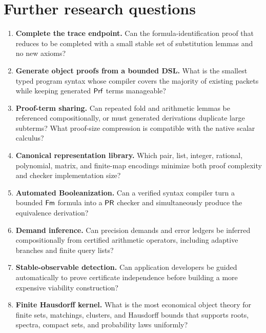 \section{Further research questions}
\label{sec:research}

\begin{enumerate}[label=\textbf{Q\arabic*.}]
\item \textbf{Complete the trace endpoint.}  Can the formula-identification
      proof that reduces  to
       be completed with a small stable set of
      substitution lemmas and no new axioms?

\item \textbf{Generate object proofs from a bounded DSL.}  What is the smallest
      typed program syntax whose compiler covers the majority of existing
      packets while keeping generated \(\mathsf{Prf}\) terms manageable?

\item \textbf{Proof-term sharing.}  Can repeated fold and arithmetic lemmas be
      referenced compositionally, or must generated derivations duplicate
      large subterms?  What proof-size compression is compatible with the
      native scalar calculus?

\item \textbf{Canonical representation library.}  Which pair, list, integer,
      rational, polynomial, matrix, and finite-map encodings minimize both
      proof complexity and checker implementation size?

\item \textbf{Automated Booleanization.}  Can a verified syntax compiler turn a
      bounded \(\mathsf{Fm}\) formula into a \(\mathsf{PR}\) checker and simultaneously produce
      the equivalence derivation?

\item \textbf{Demand inference.}  Can precision demands and error ledgers be
      inferred compositionally from certified arithmetic operators, including
      adaptive branches and finite query lists?

\item \textbf{Stable-observable detection.}  Can application developers be
      guided automatically to prove certificate independence before building a
      more expensive viability construction?

\item \textbf{Finite Hausdorff kernel.}  What is the most economical object
      theory for finite sets, matchings, clusters, and Hausdorff bounds that
      supports roots, spectra, compact sets, and probability laws uniformly?


\end{enumerate}
